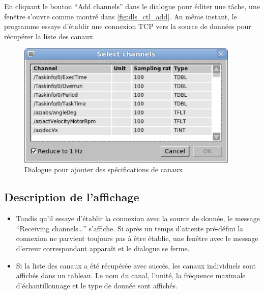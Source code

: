 \documentclass[a4paper,12pt,BCOR6mm,bibtotoc,idxtotoc]{scrbook}
\begin{document}
En cliquant le bouton ``Add channels'' dans le dialogue pour \'editer
une t\^ache, une fen\^etre s'ouvre comme montr\'e dans
\autoref{fig:dls_ctl_add}.  Au m\^eme instant, le programme essaye
d'\'etablir une connexion TCP vers la source de donn\'ees pour
r\'ecup\'erer la liste des canaux.

\begin{figure}[tbh]
  \begin{center}
    \includegraphics[width=300pt]{bilder/ctl_add_en}
  \end{center}
  \caption{Dialogue pour ajouter des sp\'ecifications de canaux}
  \label{fig:dls_ctl_add}
\end{figure}


\subsection{Description de l'affichage}

\begin{itemize}
\item Tandis qu'il essaye d'\'etablir la connexion avec la source de
  donn\'ee, le message ``Receiving channels\ldots'' s'affiche.  Si
  apr\`es un temps d'attente pr\'e-d\'efini la connexion ne parvient
  toujours pas \`a \^etre \'etablie, une fen\^etre avec le message
  d'erreur correspondant appara\^it et le dialogue se
  ferme.
\item Si la liste des canaux a \'et\'e r\'ecup\'er\'ee avec succ\`es,
  les canaux individuels sont affich\'es dans un tableau.  Le nom du
  canal, l'unit\'e, la fr\'equence maximale d'\'echantillonnage et le
  type de donn\'ee sont affich\'es.
\end{itemize}

\end{document}
